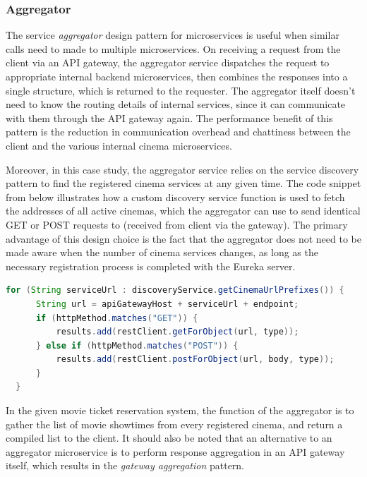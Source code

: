 \subsubsection{Aggregator}

The service \textit{aggregator} design pattern for microservices is useful when similar calls need to made to multiple microservices. On receiving a request from the client via an API gateway, the aggregator service dispatches the request to appropriate internal backend microservices, then combines the responses into a single structure, which is returned to the requester. The aggregator itself doesn't need to know the routing details of internal services, since it can communicate with them through the API gateway again. The performance benefit of this pattern is the reduction in communication overhead and chattiness between the client and the various internal cinema microservices. 

Moreover, in this case study, the aggregator service relies on the service discovery pattern to find the registered cinema services at any given time. The code snippet from  below illustrates how a custom discovery service function is used to fetch the addresses of all active cinemas, which the aggregator can use to send identical GET or POST requests to (received from client via the gateway). The primary advantage of this design choice is the fact that the aggregator does not need to be made aware when the number of cinema services changes, as long as the necessary registration process is completed with the Eureka server.

\begin{lstlisting}[language=Java, caption=Snippet from \code{AggregatorService.java}]
  for (String serviceUrl : discoveryService.getCinemaUrlPrefixes()) {
      String url = apiGatewayHost + serviceUrl + endpoint;
      if (httpMethod.matches("GET")) {
          results.add(restClient.getForObject(url, type));
      } else if (httpMethod.matches("POST")) {
          results.add(restClient.postForObject(url, body, type));
      }
  }
\end{lstlisting}

In the given movie ticket reservation system, the function of the aggregator is to gather the list of movie showtimes from every registered cinema, and return a compiled list to the client. It should also be noted that an alternative to an aggregator microservice is to perform response aggregation in an API gateway itself, which results in the \textit{gateway aggregation} pattern.

